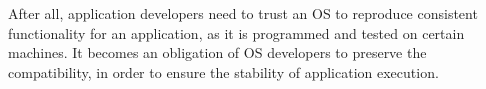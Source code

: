 After all, application developers need to trust an OS to reproduce consistent functionality for an application,
as it is programmed and tested on certain machines.
It becomes an obligation of OS developers to preserve the compatibility, in order to ensure the stability of application execution.

